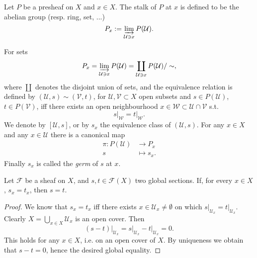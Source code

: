 \documentclass[../Main]{subfiles}
\begin{document}
\begin{defn}
	Let $P$ be a presheaf on $X$ and $x \in X$.
	The stalk of $P$ at $x$ is defined to be the abelian group (resp. ring, set, ...)
	\begin{equation}
		P_x := \varinjlim_{\mathcal{U} \ni x} P(\mathcal{U})
	.\end{equation} 
\end{defn}

\begin{rem}[Recall]
	For sets
	\begin{equation}
	P_x = 
	\varinjlim_{\mathcal{U} \ni x} P(\mathcal{U}) =
	\coprod_{\mathcal{U} \ni x} P(\mathcal{U}) / \sim	
	,\end{equation} 
	where $\coprod$ denotes the disjoint union of sets, and the
	equivalence relation is defined by
	$\left(\mathcal{U}, s\right) \sim \left(\mathcal{V}, t\right)$, for $\mathcal{U}, \mathcal{V} \subset X$
	open subsets and $s \in P(\mathcal{U})$, $t \in P(\mathcal{V})$, iff
	there exists an open neighbourhood
	$x \in \mathcal{W} \subset \mathcal{U} \cap \mathcal{V}$
	s.t.
	\begin{equation}
	\left.s\right|_{\mathcal{W}}  = \left.t\right|_{\mathcal{W}} 
	.\end{equation} 
	We denote by $\left[ \mathcal{U}, s \right]$, or by $s_x$ the equivalence class
	of $\left( \mathcal{U}, s \right)$.
	For any $x \in X$ and any $x \in \mathcal{U}$ there is a canonical map
	\begin{align}
		\pi: P(\mathcal{U}) &\longrightarrow P_x \\
		s &\longmapsto s_x
	.\end{align} 
	Finally $s_x$ is called the {\em germ} of $s$ at $x$.
\end{rem}

\begin{lem}
	Let $\mathcal{F}$ be a sheaf on $X$, and $s,t \in \mathcal{F}(X)$ two global sections.
	If, for every $x \in X$, $s_x = t_x$, then $s = t$.
\end{lem}
\begin{proof}
	We know that $s_x = t_x$ iff there exists $x \in \mathcal{U}_x \neq \emptyset$ on which
	$\left.s\right|_{\mathcal{U}_x} = \left.t\right|_{\mathcal{U}_x}$.
	Clearly $X = \bigcup_{x \in X} \mathcal{U}_x$ is an open cover.
	Then
	\begin{equation}
		\left.\left( s - t \right)\right|_{\mathcal{U}_x} =
			\left.s\right|_{\mathcal{U}_x} - \left.t\right|_{\mathcal{U}_x} =
					0
	.\end{equation} 
	This holds for any $x \in X$, i.e. on an open cover of $X$.
	By uniqueness we obtain that $s-t = 0$, hence the desired global equality.
\end{proof}
\end{document}
